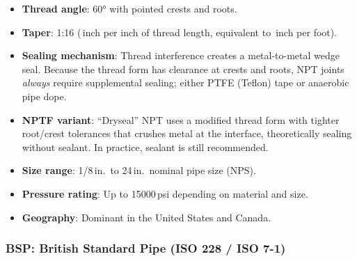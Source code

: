 \begin{itemize}[leftmargin=1.5em]
  \item \textbf{Thread angle}: \ang{60} with pointed crests and roots.
  \item \textbf{Taper}: 1:16 (\textonequarter\,inch per inch of thread length, equivalent to \textthreequarters\,inch per foot).
  \item \textbf{Sealing mechanism}: Thread interference creates a metal-to-metal wedge seal. Because the thread form has clearance at crests and roots, NPT joints \emph{always} require supplemental sealing; either PTFE (Teflon) tape or anaerobic pipe dope.
  \item \textbf{NPTF variant}: ``Dryseal'' NPT uses a modified thread form with tighter root/crest tolerances that crushes metal at the interface, theoretically sealing without sealant. In practice, sealant is still recommended.
  \item \textbf{Size range}: 1/8\,in.\ to 24\,in.\ nominal pipe size (NPS).
  \item \textbf{Pressure rating}: Up to 15000\,psi depending on material and size.
  \item \textbf{Geography}: Dominant in the United States and Canada.
\end{itemize}

\subsubsection{BSP: British Standard Pipe (ISO 228 / ISO 7-1)}

